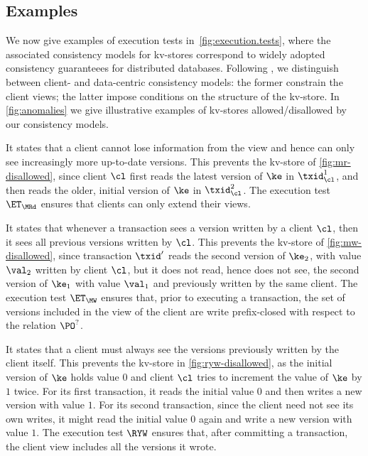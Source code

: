\subsection{Examples}\label{subsec:cm_examples}
We now give examples of execution tests in~\cref{fig:execution.tests},
where the associated consistency models for kv-stores correspond to
widely adopted consistency guaranteees for distributed databases.
Following \cite{distrprinciples}, we distinguish between
client- and data-centric consistency models: 
the former constrain the client views; 
the latter impose conditions on the structure of the kv-store.  
In \cref{fig:anomalies} we give illustrative
examples of kv-stores allowed/disallowed by our
consistency models.

It states that a client cannot lose information from the view and 
hence can only see increasingly more up-to-date versions. 
This prevents \eg the kv-store of \cref{fig:mr-disallowed},
since client $\cl$ first reads the latest version of $\ke$ in $\txid_{\cl}^{1}$, 
and then reads the older, initial version of $\ke$ in $\txid_{\cl}^{2}$.  
The execution test $\ET_{\MRd}$ ensures that clients  can only extend their views. 

It states that whenever a transaction sees a version written by a client $\cl$,
then it sees all previous versions written by $\cl$. 
This prevents \eg the kv-store of \cref{fig:mw-disallowed}, since 
transaction $\txid'$ reads the second version of $\ke_2$, 
with value $\val_2$ written by client $\cl$, 
but it does not read, hence does not see, the second version of $\ke_1$
with value $\val_1$ and previously written by the same client.
The execution test $\ET_{\MW}$  ensures that, prior to executing a transaction,
the set of versions included in the view of the client are write 
prefix-closed with respect to the relation $\PO^?$.

It states that a client must always see the versions previously written by the client itself.
This prevents the kv-store in \cref{fig:ryw-disallowed}, 
as the initial version of $\ke$ holds value $0$ 
and client $\cl$ tries to increment the value of $\ke$ by $1$ twice.  
For its first transaction, it reads the initial value $0$ and then writes a new version with value $1$. 
For its second transaction, since the client need not see its own writes, 
it might read the initial value $0$ again and write a new version with value $1$.
The execution test $\RYW$ ensures that, after committing a transaction, 
the client view includes all the versions it wrote.  
 
